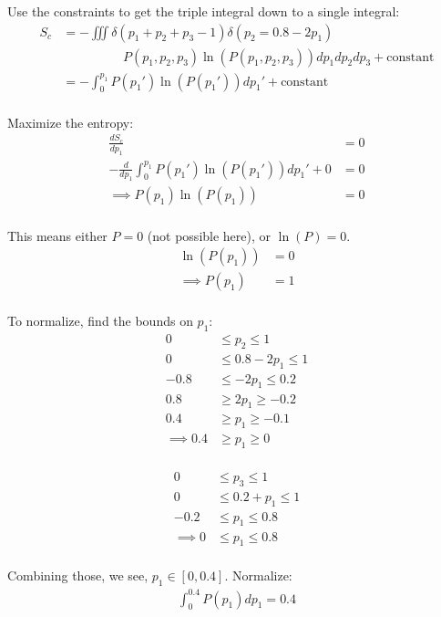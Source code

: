 \begin{enumerate}[label=\textbf{\Alph*}.]
    Use the constraints to get the triple integral down to a single integral:
    \begin{align*}
        S_c &= -\iiint \delta(p_1 + p_2 + p_3 - 1) \delta(p_2 = 0.8 - 2p_1) \\
        &\hspace{2cm}P(p_1, p_2, p_3) \ln(P(p_1, p_2, p_3)) dp_1 dp_2 dp_3 + \text{constant} \\
        &= -\int_0^{p_1} P(p_1') \ln(P(p_1')) dp_1' + \text{constant} \\
    \end{align*}

    Maximize the entropy:
    \begin{align*}
        \frac{dS_c}{dp_1} &= 0 \\
        -\frac{d}{dp_1}\int_0^{p_1} P(p_1') \ln(P(p_1')) dp_1' + 0 &= 0 \\
        \implies P(p_1) \ln(P(p_1)) &= 0 \\
    \end{align*}

    This means either $P = 0$ (not possible here), or $\ln(P) = 0$.
    \begin{align*}
        \ln(P(p_1)) &= 0 \\
        \implies P(p_1) &= 1 \\
    \end{align*}

    To normalize, find the bounds on $p_1$:
    \begin{align*}
        0 &\le p_2 \le 1 \\
        0 &\le 0.8 - 2p_1 \le 1 \\
        -0.8 &\le - 2p_1 \le 0.2 \\
        0.8 &\ge 2p_1 \ge -0.2 \\
        0.4 &\ge p_1 \ge -0.1 \\
        \implies 0.4 &\ge p_1 \ge 0 \\
    \end{align*}

    \begin{align*}
        0 &\le p_3 \le 1 \\
        0 &\le 0.2 + p_1 \le 1 \\
        -0.2 &\le p_1 \le 0.8 \\
        \implies 0 &\le p_1 \le 0.8 \\
    \end{align*}

    Combining those, we see, $p_1 \in [0, 0.4]$. Normalize:
    \begin{align*}
        \int_0^{0.4} P(p_1) dp_1 = 0.4
    \end{align*}


\end{enumerate}
